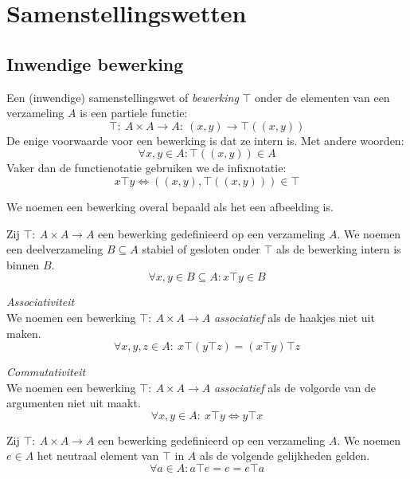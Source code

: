 \documentclass[main.tex]{subfiles}
\begin{document}
\chapter{Samenstellingswetten}
\label{cha:samenstellingswetten}

\section{Inwendige bewerking}
\label{sec:inwendige-bewerking}

\begin{de}
  Een (inwendige) samenstellingswet of \emph{bewerking} $\top$ onder de elementen van een verzameling $A$ is een partiele functie:
  \[ \top:\ A\times A \rightarrow A:\ (x,y) \rightarrow \top((x,y)) \]
  De enige voorwaarde voor een bewerking is dat ze intern is.
  Met andere woorden:
  \[ \forall x,y \in A: \top((x,y)) \in A \]
  Vaker dan de functienotatie gebruiken we de infixnotatie:
  \[ x \top y \Leftrightarrow  ((x,y),\top((x,y))) \in \top \]
\end{de}

\begin{de}
  We noemen een bewerking overal bepaald als het een afbeelding is.
\end{de}

\begin{de}
  Zij $\top:\ A\times A\rightarrow A$ een bewerking gedefinieerd op een verzameling $A$.
  We noemen een deelverzameling $B\subseteq A$ stabiel of gesloten onder $\top$ als de bewerking intern is binnen $B$.
  \[ \forall x,y \in B\subseteq A: x \top y \in B \]
\end{de}

\begin{de}
  \emph{Associativiteit}\\
  We noemen een bewerking $\top:\ A\times A\rightarrow A$ \emph{associatief} als de haakjes niet uit maken.
  \[ \forall x,y,z \in A:\ x\top(y\top z) = (x\top y) \top z \]
\end{de}

\begin{de}
  \emph{Commutativiteit}\\
  We noemen een bewerking $\top:\ A\times A\rightarrow A$ \emph{associatief} als de volgorde van de argumenten niet uit maakt.
  \[ \forall x,y \in A:\ x \top y \Leftrightarrow y \top x \]
\end{de}

\begin{de}
  Zij $\top:\ A\times A\rightarrow A$ een bewerking gedefinieerd op een verzameling $A$.
  We noemen $e\in A$ het neutraal element van $\top$ in $A$ als de volgende gelijkheden gelden.
  \[ \forall a \in A: a\top e = e = e\top a \]
\end{de}
\end{document}
